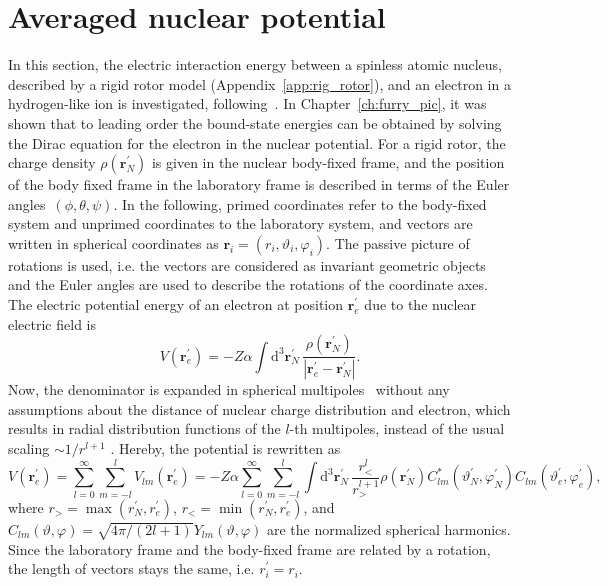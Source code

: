 \section{Averaged nuclear potential}
\label{sec:gfac_avpot}
In this section, the electric interaction energy between a spinless atomic nucleus, described by a rigid rotor model (Appendix~\ref{app:rig_rotor}), and an electron in a hydrogen-like ion is investigated, following~\cite{kozhedub2008,jacek2012}. In Chapter~\ref{ch:furry_pic}, it was shown that to leading order the bound-state energies can be obtained by solving the Dirac equation for the electron in the nuclear potential. For a rigid rotor, the charge density $\rho(\mathbf{r}^{\prime}_N)$ is given in the nuclear body-fixed frame, and the position of the body fixed frame in the laboratory frame is described in terms of the Euler angles~$(\phi,\theta,\psi)$. In the following, primed coordinates refer to the body-fixed system and unprimed coordinates to the laboratory system, and vectors are written in spherical coordinates as $\mathbf{r}_i=(r_i,\vartheta_i,\varphi_i)$. The passive picture of rotations is used, i.e. the vectors are considered as invariant geometric objects and the Euler angles are used to describe the rotations of the coordinate axes. The electric potential energy of an electron at position $\mathbf{r}_{e}^\prime$ due to the nuclear electric field is
\begin{equation}
V(\mathbf{r}_e^\prime)=-Z\alpha \int\mathrm{d}^3\mathbf{r}_N^\prime\,
\frac{\rho(\mathbf{r}_N^\prime)}{\left|\mathbf{r}_e^\prime - \mathbf{r}_N^\prime\right|}.
\end{equation}
Now, the denominator is expanded in spherical multipoles~\cite{jackson1999} without any assumptions about the distance of nuclear charge distribution and electron, which results in radial distribution functions of the $l$-th multipoles, instead of the usual scaling $\sim 1/r^{l+1}$ . Hereby, the potential is rewritten as
\begin{equation}
V(\mathbf{r}_e^\prime)=\sum_{l=0}^\infty \sum_{m=-l}^l V_{lm}(\mathbf{r}_e^\prime)=-Z\alpha \sum_{l=0}^\infty \sum_{m=-l}^l
\int\mathrm{d}^3\mathbf{r}_N^{\prime}\,\frac{r_<^l}{r_>^{l+1}}\rho(\mathbf{r}_N^\prime) C_{lm}^*(\vartheta^\prime_N,\varphi_N^\prime) C_{lm}(\vartheta^\prime_e,\varphi_e^\prime),
\label{eq:mulitipoles_1}
\end{equation}
where $r_>=\max(r^\prime_N,r^\prime_e)$, $r_<=\min(r^\prime_N,r^\prime_e)$, and $C_{lm}(\vartheta,\varphi)=\sqrt{4\pi/(2l+1)}Y_{lm}(\vartheta,\varphi)$ are the normalized spherical harmonics. Since the laboratory frame and the body-fixed frame are related by a rotation, the length of vectors stays the same, i.e. $r^\prime_i = r_i$.

